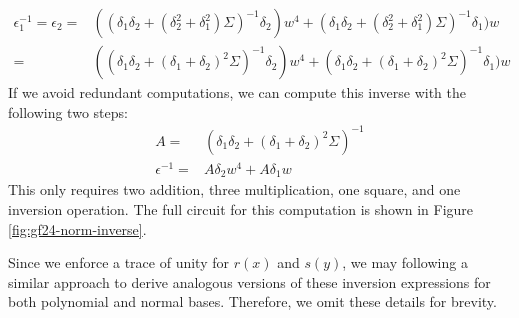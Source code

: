 \begin{align*}
\epsilon_1^{-1} = \epsilon_2 = & ((\delta_1\delta_2 + (\delta_2^2 + \delta_1^2)\Sigma)^{-1}\delta_2) w^4 + (\delta_1\delta_2 + (\delta_2^2 + \delta_1^2)\Sigma)^{-1}\delta_1) w \\
= & ((\delta_1\delta_2 + (\delta_1 + \delta_2)^2\Sigma)^{-1}\delta_2) w^4 + (\delta_1\delta_2 + (\delta_1 + \delta_2)^2\Sigma)^{-1}\delta_1) w
\end{align*}
If we avoid redundant computations, we can compute this inverse with the following two steps:
\begin{align*}
A = & (\delta_1\delta_2 + (\delta_1 + \delta_2)^2\Sigma)^{-1} \\
\epsilon^{-1} = & A\delta_2 w^4 + A\delta_1 w
\end{align*}
This only requires two addition, three multiplication, one square, and one inversion operation. The full circuit for this computation is shown in Figure \ref{fig:gf24-norm-inverse}.

Since we enforce a trace of unity for $r(x)$ and $s(y)$, we may following a similar approach to derive analogous versions of these inversion expressions for both polynomial and normal bases. Therefore, we omit these details for brevity. 


